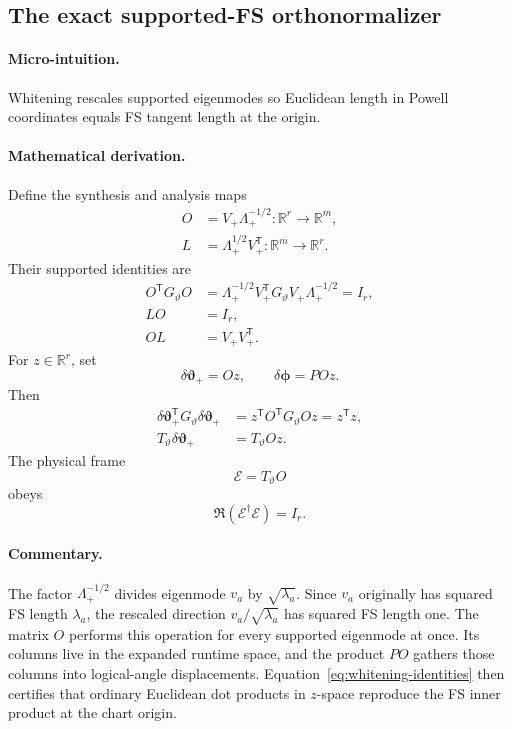 \documentclass[10pt,twocolumn]{article}
\newcommand{\R}{\mathbb R}
\newcommand{\micro}{\paragraph{Micro-intuition.}}
\newcommand{\mathderiv}{\paragraph{Mathematical derivation.}}
\newcommand{\commentaryblock}{\paragraph{Commentary.}}
\begin{document}
\subsection*{The exact supported-FS orthonormalizer}

\micro Whitening rescales supported eigenmodes so Euclidean length in Powell
coordinates equals FS tangent length at the origin.

\mathderiv Define the synthesis and analysis maps
\begin{align}
O&=V_+\Lambda_+^{-1/2}:\R^r\longrightarrow\R^m,\nonumber\\
L&=\Lambda_+^{1/2}V_+^{\mathsf T}:\R^m\longrightarrow\R^r.
\label{eq:analysis-synthesis-maps}
\end{align}
Their supported identities are
\begin{align}
O^{\mathsf T}G_\vartheta O
&=\Lambda_+^{-1/2}V_+^{\mathsf T}
G_\vartheta V_+\Lambda_+^{-1/2}=I_r,\nonumber\\
LO&=I_r,\nonumber\\
OL&=V_+V_+^{\mathsf T}.
\label{eq:whitening-identities}
\end{align}
For \(z\in\R^r\), set
\begin{equation}
\delta\bm\vartheta_+=Oz,\qquad
\delta\bm\phi=POz.
\label{eq:whitened-lifts}
\end{equation}
Then
\begin{align}
\delta\bm\vartheta_+^{\mathsf T}G_\vartheta
\delta\bm\vartheta_+
&=z^{\mathsf T}O^{\mathsf T}G_\vartheta Oz
=z^{\mathsf T}z,\nonumber\\
T_\vartheta\delta\bm\vartheta_+
&=T_\vartheta Oz.
\label{eq:whitened-length}
\end{align}
The physical frame
\begin{equation}
\mathcal E=T_\vartheta O
\label{eq:physical-frame}
\end{equation}
obeys
\begin{equation}
\Re(\mathcal E^\dagger\mathcal E)=I_r.
\label{eq:physical-frame-orthonormal}
\end{equation}

\commentaryblock The factor \(\Lambda_+^{-1/2}\) divides eigenmode \(v_a\) by
\(\sqrt{\lambda_a}\). Since \(v_a\) originally has squared FS length
\(\lambda_a\), the rescaled direction
\(v_a/\sqrt{\lambda_a}\) has squared FS length one. The matrix \(O\) performs
this operation for every supported eigenmode at once. Its columns live in the
expanded runtime space, and the product \(PO\) gathers those columns into
logical-angle displacements. Equation~\eqref{eq:whitening-identities} then
certifies that ordinary Euclidean dot products in \(z\)-space reproduce the
FS inner product at the chart origin.
\end{document}
